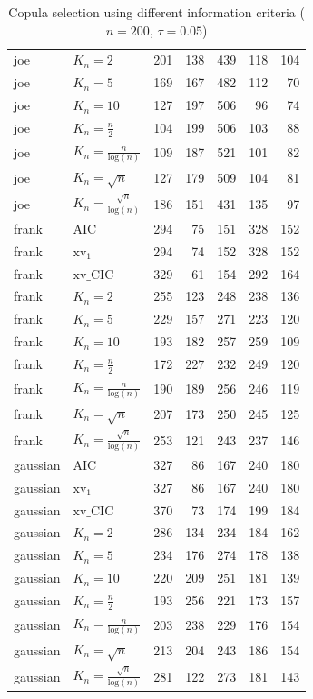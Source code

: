 \begin{table}[htbp]
\begin{tabular}{llrrrrr}
  joe & $K_{n}=2$ & 201 & 138 & 439 & 118 & 104 \\ 
  joe & $K_{n}=5$ & 169 & 167 & 482 & 112 & 70 \\ 
  joe & $K_{n}=10$ & 127 & 197 & 506 & 96 & 74 \\ 
  joe & $K_{n}=\tfrac{n}{2}$ & 104 & 199 & 506 & 103 & 88 \\ 
  joe & $K_{n}=\tfrac{n}{\text{log}(n)}$ & 109 & 187 & 521 & 101 & 82 \\ 
  joe & $K_{n}=\sqrt{n}$ & 127 & 179 & 509 & 104 & 81 \\ 
  joe & $K_{n}=\tfrac{\sqrt{n}}{\text{log}(n)}$ & 186 & 151 & 431 & 135 & 97 \\ 
   \hdashline
frank & AIC & 294 & 75 & 151 & 328 & 152 \\ 
  frank & $\text{xv}_{1}$ & 294 & 74 & 152 & 328 & 152 \\ 
  frank & $\text{xv}\_\text{CIC}$ & 329 & 61 & 154 & 292 & 164 \\ 
  frank & $K_{n}=2$ & 255 & 123 & 248 & 238 & 136 \\ 
  frank & $K_{n}=5$ & 229 & 157 & 271 & 223 & 120 \\ 
  frank & $K_{n}=10$ & 193 & 182 & 257 & 259 & 109 \\ 
  frank & $K_{n}=\tfrac{n}{2}$ & 172 & 227 & 232 & 249 & 120 \\ 
  frank & $K_{n}=\tfrac{n}{\text{log}(n)}$ & 190 & 189 & 256 & 246 & 119 \\ 
  frank & $K_{n}=\sqrt{n}$ & 207 & 173 & 250 & 245 & 125 \\ 
  frank & $K_{n}=\tfrac{\sqrt{n}}{\text{log}(n)}$ & 253 & 121 & 243 & 237 & 146 \\ 
   \hdashline
gaussian & AIC & 327 & 86 & 167 & 240 & 180 \\ 
  gaussian & $\text{xv}_{1}$ & 327 & 86 & 167 & 240 & 180 \\ 
  gaussian & $\text{xv}\_\text{CIC}$ & 370 & 73 & 174 & 199 & 184 \\ 
  gaussian & $K_{n}=2$ & 286 & 134 & 234 & 184 & 162 \\ 
  gaussian & $K_{n}=5$ & 234 & 176 & 274 & 178 & 138 \\ 
  gaussian & $K_{n}=10$ & 220 & 209 & 251 & 181 & 139 \\ 
  gaussian & $K_{n}=\tfrac{n}{2}$ & 193 & 256 & 221 & 173 & 157 \\ 
  gaussian & $K_{n}=\tfrac{n}{\text{log}(n)}$ & 203 & 238 & 229 & 176 & 154 \\ 
  gaussian & $K_{n}=\sqrt{n}$ & 213 & 204 & 243 & 186 & 154 \\ 
  gaussian & $K_{n}=\tfrac{\sqrt{n}}{\text{log}(n)}$ & 281 & 122 & 273 & 181 & 143 \\ 
   \hline
\end{tabular}
\caption{Copula selection using different information criteria ($n = 200$, $\tau = 0.05$)} 
\end{table}


